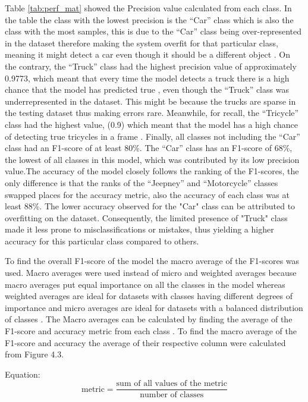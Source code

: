 Table \ref{tab:perf_mat} showed the Precision value calculated from each class. In the table the class with the lowest precision is the “Car” class which is also the class with the most samples, this is due to the “Car” class being over-represented in the dataset therefore making the system overfit for that particular class, meaning it might detect a car even though it should be a different object \cite{Raj_2019}. On the contrary, the “Truck” class had the highest precision value of approximately 0.9773, which meant that every time the model detects a truck there is a high chance that the model has predicted true \cite{D_Powers}, even though the “Truck” class was underrepresented in the dataset. This might be because the trucks are sparse in the testing dataset thus making errors rare. Meanwhile, for recall, the “Tricycle” class had the highest value, (0.9) which meant that the model has a high chance of detecting true tricycles in a frame \cite{D_Powers}. Finally, all classes not including the “Car” class had an F1-score of at least 80\%. The “Car” class has an F1-score of 68\%, the lowest of all classes in this model, which was contributed by its low precision value.The accuracy of the model closely follows the ranking of the F1-scores, the only difference is that the ranks of the “Jeepney” and “Motorcycle” classes swapped places for the accuracy metric, also the accuracy of each class was at least 88\%. The lower accuracy observed for the "Car" class can be attributed to overfitting on the dataset. Consequently, the limited presence of "Truck" class made it less prone to misclassifications or mistakes, thus yielding a higher accuracy for this particular class compared to others.


To find the overall F1-score of the model the macro average of the F1-scores was used. Macro averages were used instead of micro and weighted averages because macro averages put equal importance on all the classes in the model whereas weighted averages are ideal for datasets with classes having different degrees of importance and micro averages are ideal for datasets with a balanced distribution of classes \cite{Leung_2022}. The Macro averages can be calculated by finding the average of the F1-score and accuracy metric from each class \cite{Leung_2022}. To find the macro average of the F1-score and accuracy the average of their respective column were calculated from Figure 4.3.

Equation:
\begin{equation}
	{\text{metric}}= \frac{\text{sum of all values of the metric}}{\text{number of classes}} 
\end{equation}

